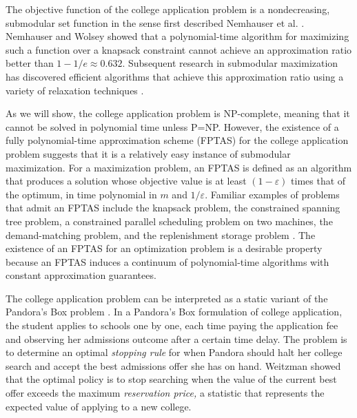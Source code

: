The objective function of the college application problem is a nondecreasing, submodular set function in the sense first described Nemhauser et al. \cite{nemhauseretal1978}. Nemhauser and Wolsey \cite{nemhauserandwolsey1978} showed that a polynomial-time algorithm for maximizing such a function over a knapsack constraint cannot achieve an approximation ratio better than $1 - 1 / e \approx 0.632$. Subsequent research in submodular maximization has discovered efficient algorithms that achieve this approximation ratio using a variety of relaxation techniques \cite{chekurietal2014,badanidiyuruandvondrak2014,kuliketal2013}.

As we will show, the college application problem is NP-complete, meaning that it cannot be solved in polynomial time unless P=NP. However, the existence of a fully polynomial-time approximation scheme (FPTAS) for the college application problem suggests that it is a relatively easy instance of submodular maximization. For a maximization problem, an FPTAS is defined as an algorithm that produces a solution whose objective value is at least $(1 - \varepsilon)$ times that of the optimum, in time polynomial in $m$ and $1 / \varepsilon$. Familiar examples of problems that admit an FPTAS include the knapsack problem, the constrained spanning tree problem, a constrained parallel scheduling problem on two machines, the demand-matching problem, and the replenishment storage problem \cite{vazirani2001,hongetal2004,woeginger2005,shepherdandvetta2007,hochbaumandrao2020}. The existence of an FPTAS for an optimization problem is a desirable property because an FPTAS induces a continuum of polynomial-time algorithms with constant approximation guarantees.

The college application problem can be interpreted as a static variant of the Pandora's Box problem \cite{weitzman1979,boodaghiansetal2022}. In a Pandora's Box formulation of college application, the student applies to schools one by one, each time paying the application fee and observing her admissions outcome after a certain time delay. The problem is to determine an optimal \emph{stopping rule} for when Pandora should halt her college search and accept the best admissions offer she has on hand. Weitzman showed that the optimal policy is to stop searching when the value of the current best offer exceeds the maximum \emph{reservation price,} a statistic that represents the expected value of applying to a new college.

